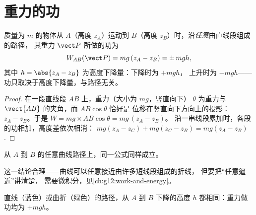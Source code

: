 \section{重力的功}

\begin{proposition}[重力的功]\label{prop:g11:work-of-force:weight}
质量为 $m$ 的物体从 $A$（高度 $z_A$）运动到
$B$（高度 $z_B$）时，沿\emph{任意}由直线段组成的路径，
其重力 $\vect P$ 所做的功为
\[
W_{AB}(\vect P) = mg\,(z_A - z_B) = \pm\, mgh ,
\]
其中 $h = \abs{z_A - z_B}$ 为高度下降量：下降时为 $+mgh$，
上升时为 $-mgh$——功只取决于高度下降量，与路径无关。
\end{proposition}

\begin{proof}
在一段直线段 $AB$ 上，重力（大小为 $mg$，竖直向下）
$\theta$ 为重力与 $\vect{AB}$ 的夹角，而 $AB\cos\theta$ 恰好是
位移在竖直向下方向上的投影：
$z_A - z_B$。于是 $W = mg \times AB\cos\theta = mg\,(z_A - z_B)$。
沿一串线段累加时，各段的功相加，高度差依次相消：
$mg(z_A - z_C) + mg(z_C - z_B) = mg(z_A - z_B)$.
\end{proof}

\begin{proposition}[任意路径]\label{prop:g11:work-of-force:anypath}
从 $A$ 到 $B$ 的任意曲线路径上，同一公式同样成立。
\end{proposition}
\admitted

\begin{remark}\label{rem:g11:work-of-force:anypath}
这一结论合理——曲线可以任意接近由许多短线段组成的折线，
但要把“任意逼近”讲清楚，
需要微积分，见\cref{ch:g12:work-and-energy}。
\end{remark}

\begin{omfigure}

{\small 直线（蓝色）或曲折（绿色）的路径，从 $A$
到 $B$ 下降的高度 $h$ 都相同：重力做功均为 $+mgh$。}
\end{omfigure}

